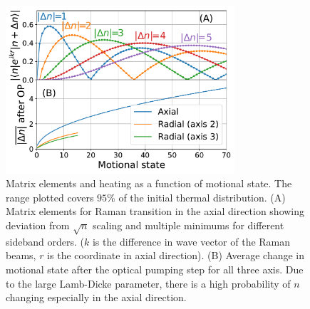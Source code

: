 \documentclass[aps,prl,twocolumn,groupedaddress]{revtex4-1}
\begin{document}
\begin{figure}[b]
  \includegraphics[width=8.5cm]{imgs/fig2_raman_op.pdf}
  \caption{Matrix elements and heating as a function of motional state.
    The range plotted covers $95$\% of the initial thermal distribution.
    (A) Matrix elements for Raman transition in the axial direction showing deviation from
    $\sqrt{n}$ scaling and multiple minimums for different sideband orders.
    ($k$ is the difference in wave vector of the Raman beams,
    $r$ is the coordinate in axial direction).
    (B) Average change in motional state after the optical pumping step for all three axis.
    Due to the large Lamb-Dicke parameter,
    there is a high probability of $n$ changing especially in the axial direction.
    \label{f-ld}}
\end{figure}
\end{document}
